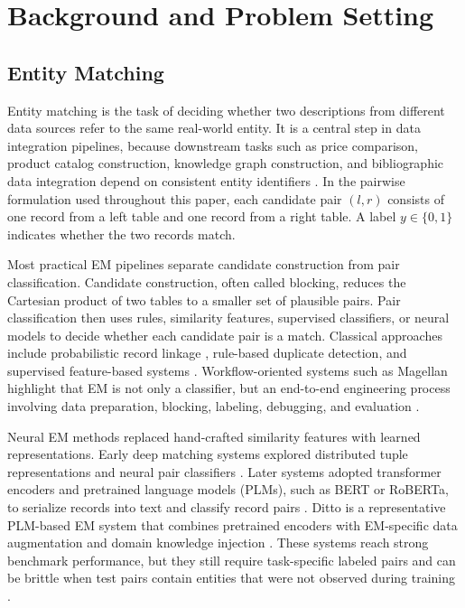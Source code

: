 \section{Background and Problem Setting}

\subsection{Entity Matching}

Entity matching is the task of deciding whether two descriptions from different data sources refer to the same real-world entity. It is a central step in data integration pipelines, because downstream tasks such as price comparison, product catalog construction, knowledge graph construction, and bibliographic data integration depend on consistent entity identifiers \cite{christophides2020overview,christophides2015webdata}. In the pairwise formulation used throughout this paper, each candidate pair $(l, r)$ consists of one record from a left table and one record from a right table. A label $y \in \{0,1\}$ indicates whether the two records match.

Most practical EM pipelines separate candidate construction from pair classification. Candidate construction, often called blocking, reduces the Cartesian product of two tables to a smaller set of plausible pairs. Pair classification then uses rules, similarity features, supervised classifiers, or neural models to decide whether each candidate pair is a match. Classical approaches include probabilistic record linkage \cite{fellegi1969record}, rule-based duplicate detection, and supervised feature-based systems \cite{elmagarmid2007duplicate,christen2012data}. Workflow-oriented systems such as Magellan highlight that EM is not only a classifier, but an end-to-end engineering process involving data preparation, blocking, labeling, debugging, and evaluation \cite{konda2016magellan}.

Neural EM methods replaced hand-crafted similarity features with learned representations. Early deep matching systems explored distributed tuple representations and neural pair classifiers \cite{mudgal2018deep}. Later systems adopted transformer encoders and pretrained language models (PLMs), such as BERT or RoBERTa, to serialize records into text and classify record pairs \cite{brunner2020transformer,li2020ditto}. Ditto is a representative PLM-based EM system that combines pretrained encoders with EM-specific data augmentation and domain knowledge injection \cite{li2020ditto}. These systems reach strong benchmark performance, but they still require task-specific labeled pairs and can be brittle when test pairs contain entities that were not observed during training \cite{peeters2025llmem}.


